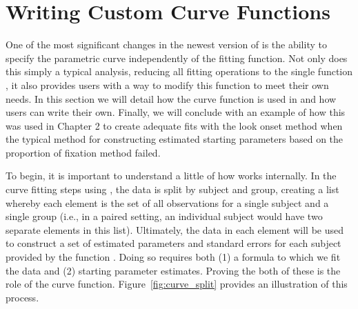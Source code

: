 \section{Writing Custom Curve Functions}

One of the most significant changes in the newest version of  is the ability to specify the parametric curve independently of the fitting function. Not only does this simply a typical analysis, reducing all fitting operations to the single function , it also provides users with a way to modify this function to meet their own needs. In this section we will detail how the curve function is used in  and how users can write their own. Finally, we will conclude with an example of how this was used in Chapter 2 to create adequate fits with the  look onset method when the typical method for constructing estimated starting parameters based on the proportion of fixation method failed.

To begin, it is important to understand a little of how  works internally. In the curve fitting steps using , the data is split by subject and group, creating a list whereby each element is the set of all observations for a single subject and a single group (i.e., in a paired setting, an individual subject would have two separate elements in this list). Ultimately, the data in each element will be used to construct a set of estimated parameters and standard errors for each subject provided by the function . Doing so requires both (1) a formula to which  we fit the data and (2) starting parameter estimates. Proving the both of these is the role of the curve function. Figure~\ref{fig:curve_split} provides an illustration of this process.




